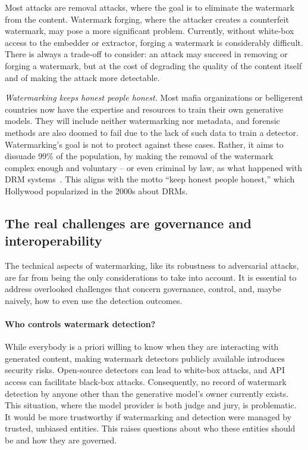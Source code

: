 Most attacks are removal attacks, where the goal is to eliminate the watermark from the content. 
Watermark forging, where the attacker creates a counterfeit watermark, may pose a more significant problem. 
Currently, without white-box access to the embedder or extractor, forging a watermark is considerably difficult. 
There is always a trade-off to consider: an attack may succeed in removing or forging a watermark, but at the cost of degrading the quality of the content itself and of making the attack more detectable.

\emph{Watermarking keeps honest people honest.}
Most mafia organizations or belligerent countries now have the expertise and resources to train their own generative models. 
They will include neither watermarking nor metadata, and forensic methods are also doomed to fail due to the lack of such data to train a detector. 
Watermarking's goal is not to protect against these cases.
Rather, it aims to dissuade 99\% of the population, by making the removal of the watermark complex enough and voluntary -- or even criminal by law, as what happened with DRM systems~\citep{enwiki:1221667351}.
This aligns with the motto ``keep honest people honest,'' which Hollywood popularized in the 2000s about DRMs.


\subsection{The real challenges are governance and interoperability}

The technical aspects of watermarking, like its robustness to adversarial attacks, are far from being the only considerations to take into account. 
It is essential to address overlooked challenges that concern governance, control, and, maybe naively, how to even use the detection outcomes. 

\paragraph*{Who controls watermark detection?}

While everybody is a priori willing to know when they are interacting with generated content, making watermark detectors publicly available introduces security risks.
Open-source detectors can lead to white-box attacks, and API access can facilitate black-box attacks.
Consequently, no record of watermark detection by anyone other than the generative model's owner currently exists.
This situation, where the model provider is both judge and jury, is problematic. 
It would be more trustworthy if watermarking and detection were managed by trusted, unbiased entities. 
This raises questions about who these entities should be and how they are governed. 

